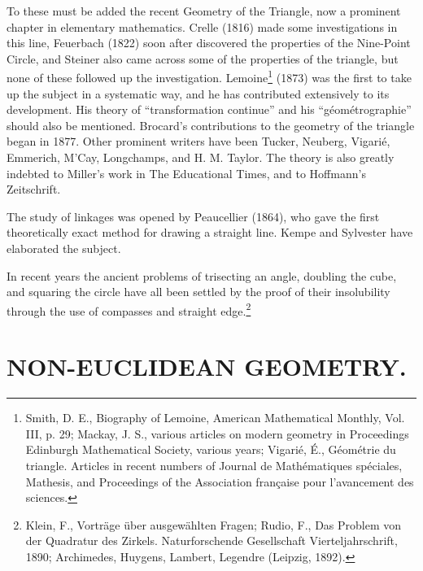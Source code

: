 \documentclass[oneside]{book}
\begin{document}
{To these must be added the recent Geometry of the Triangle, now a
prominent chapter in elementary mathematics. Crelle (1816) made
some investigations in this line, Feuerbach (1822) soon after
discovered the properties of the Nine-Point Circle, and Steiner also
came across some of the properties of the triangle, but none of
these followed up the investigation. Lemoine\footnote{Smith,
D. E., Biography of Lemoine, American Mathematical Monthly,
Vol. III, p. 29; Mackay, J. S., various articles on modern geometry
in Proceedings Edinburgh Mathematical Society, various years;
Vigari\'e, \'E., G\'eom\'etrie du triangle. Articles in recent
numbers of Journal de Math\'ematiques sp\'eciales, Mathesis, and
Proceedings of the Association fran\c{c}aise pour l'avancement des
sciences.} (1873) was the first to take up the subject in a
systematic way, and he has contributed extensively to its
development. His theory of ``transformation continue'' and his
``g\'eom\'etrographie'' should also be mentioned. Brocard's
contributions to the geometry of the triangle began in 1877. Other
prominent writers have been Tucker, Neuberg, Vigari\'e, Emmerich,
M'Cay, Longchamps, and H. M. Taylor. The theory is also greatly
indebted to Miller's work in The Educational Times, and to
Hoffmann's Zeitschrift.

The study of linkages was opened by Peaucellier (1864), who gave the
first theoretically exact method for drawing a straight line. Kempe
and Sylvester have elaborated the subject.

In recent years the ancient problems of trisecting an angle,
doubling the cube, and squaring the circle have all been settled by
the proof of their insolubility through the use of compasses and
straight edge.\footnote{Klein, F., Vortr\"age \"uber ausgew\"ahlten
Fragen; Rudio, F., Das Problem von der Quadratur des Zirkels.
Naturforschende Gesellschaft Vierteljahrschrift, 1890; Archimedes,
Huygens, Lambert, Legendre (Leipzig, 1892).}

\chapter{NON-EUCLIDEAN GEOMETRY.}

}
\end{document}
